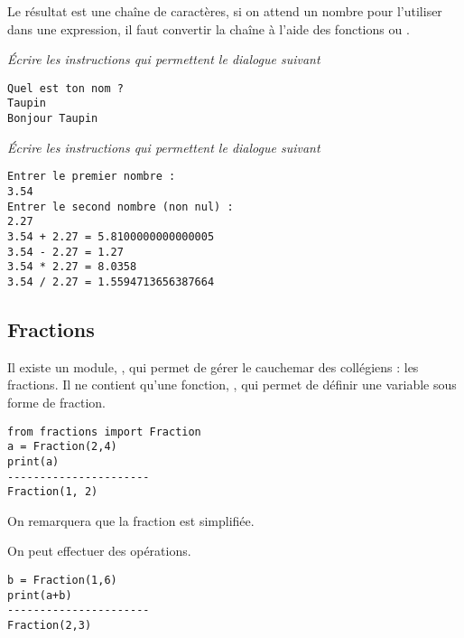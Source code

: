 Le résultat est une chaîne de caractères, si on attend un nombre pour l'utiliser dans une expression, il faut convertir la chaîne à l'aide des fonctions  ou .
\begin{Exercise}
{\it  Écrire les instructions qui permettent le dialogue suivant
\begin{lstlisting}
Quel est ton nom ?
Taupin
Bonjour Taupin
\end{lstlisting}
}
\end{Exercise}
\begin{Exercise}
{\it Écrire les instructions qui permettent le dialogue suivant

\begin{lstlisting}
Entrer le premier nombre :
3.54
Entrer le second nombre (non nul) :
2.27
3.54 + 2.27 = 5.8100000000000005
3.54 - 2.27 = 1.27
3.54 * 2.27 = 8.0358
3.54 / 2.27 = 1.5594713656387664
\end{lstlisting}}
\end{Exercise}
\subsection{Fractions}
Il existe un module, , qui permet de gérer le cauchemar des collégiens : les fractions.
Il ne contient qu'une fonction, , qui permet de définir une variable sous forme de fraction.
\begin{lstlisting}
from fractions import Fraction
a = Fraction(2,4)
print(a)
----------------------
Fraction(1, 2)
\end{lstlisting}

On remarquera que la fraction est simplifiée.

On peut effectuer des opérations.
\begin{lstlisting}
b = Fraction(1,6)
print(a+b)
----------------------
Fraction(2,3)
\end{lstlisting}

